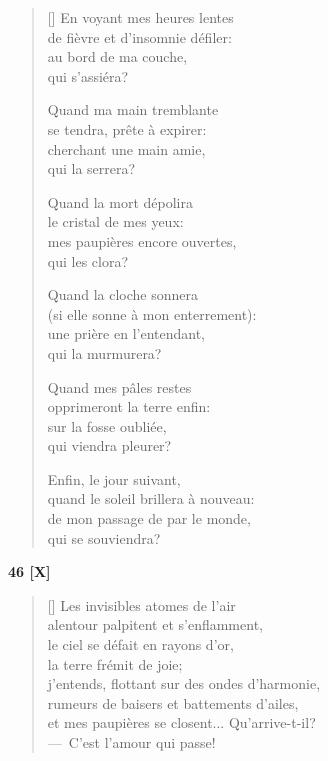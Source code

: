 \documentclass[a4paper,12pt]{book}
\begin{document}
\settowidth{\versewidth}{quand le soleil brillera à nouveau:}

\begin{verse}[\versewidth]
  En voyant mes heures lentes \\
  de fièvre et d'insomnie défiler: \\
  au bord de ma couche, \\
  qui s'assiéra?

  Quand ma main tremblante \\
  se tendra, prête à expirer: \\
  cherchant une main amie, \\
  qui la serrera?

  Quand la mort dépolira \\
  le cristal de mes yeux: \\
  mes paupières encore ouvertes, \\
  qui les clora?

  Quand la cloche sonnera \\
  (si elle sonne à mon enterrement): \\
  une prière en l'entendant, \\
  qui la murmurera?

  Quand mes pâles restes \\
  opprimeront la terre enfin: \\
  sur la fosse oubliée, \\
  qui viendra pleurer?

  Enfin, le jour suivant, \\
  quand le soleil brillera à nouveau: \\
  de mon passage de par le monde, \\
  qui se souviendra?
\end{verse}

\bigskip

\begin{center}
  \textbf{46 [X]}
\end{center}

\settowidth{\versewidth}{Dis-moi...? Silence! C'est l'amour qui passe!}

\begin{verse}[\versewidth]
  Les invisibles atomes de l'air \\
  alentour palpitent et s'enflamment, \\
  le ciel se défait en rayons d'or, \\
  la terre frémit de joie; \\
  j'entends, flottant sur des ondes d'harmonie, \\
  rumeurs de baisers et battements d'ailes, \\
  et mes paupières se closent... Qu'arrive-t-il? \\
  ---~C'est l'amour qui passe!
\end{verse}
\end{document}
